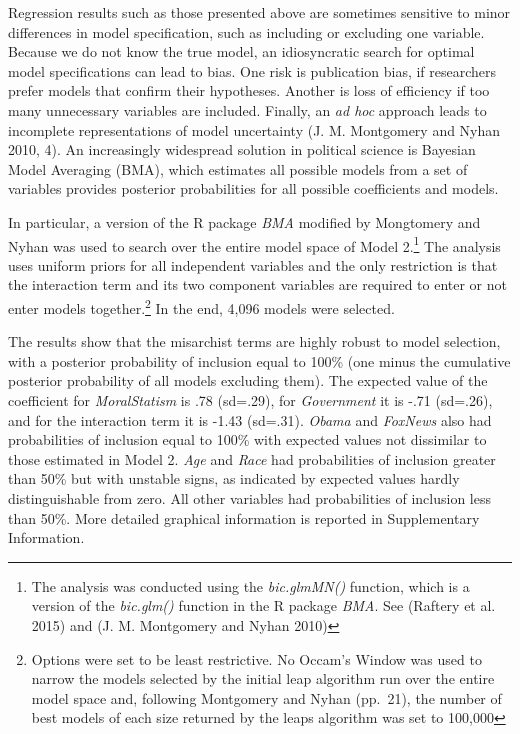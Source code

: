 \documentclass[12pt,]{article}
\let\rmarkdownfootnote\footnote%
\def\footnote{\protect\rmarkdownfootnote}
\begin{document}
Regression results such as those presented above are sometimes sensitive
to minor differences in model specification, such as including or
excluding one variable. Because we do not know the true model, an
idiosyncratic search for optimal model specifications can lead to bias.
One risk is publication bias, if researchers prefer models that confirm
their hypotheses. Another is loss of efficiency if too many unnecessary
variables are included. Finally, an \emph{ad hoc} approach leads to
incomplete representations of model uncertainty (J. M. Montgomery and
Nyhan 2010, 4). An increasingly widespread solution in political science
is Bayesian Model Averaging (BMA), which estimates all possible models
from a set of variables provides posterior probabilities for all
possible coefficients and models.

In particular, a version of the R package \emph{BMA} modified by
Mongtomery and Nyhan was used to search over the entire model space of
Model 2.\footnote{The analysis was conducted using the
  \emph{bic.glmMN()} function, which is a version of the
  \emph{bic.glm()} function in the R package \emph{BMA}. See (Raftery et
  al. 2015) and (J. M. Montgomery and Nyhan 2010)} The analysis uses
uniform priors for all independent variables and the only restriction is
that the interaction term and its two component variables are required
to enter or not enter models together.\footnote{Options were set to be
  least restrictive. No Occam's Window was used to narrow the models
  selected by the initial leap algorithm run over the entire model space
  and, following Montgomery and Nyhan (pp.~21), the number of best
  models of each size returned by the leaps algorithm was set to 100,000}
In the end, 4,096 models were selected.

The results show that the misarchist terms are highly robust to model
selection, with a posterior probability of inclusion equal to 100\% (one
minus the cumulative posterior probability of all models excluding
them). The expected value of the coefficient for \emph{MoralStatism} is
.78 (sd=.29), for \emph{Government} it is -.71 (sd=.26), and for the
interaction term it is -1.43 (sd=.31). \emph{Obama} and \emph{FoxNews}
also had probabilities of inclusion equal to 100\% with expected values
not dissimilar to those estimated in Model 2. \emph{Age} and \emph{Race}
had probabilities of inclusion greater than 50\% but with unstable
signs, as indicated by expected values hardly distinguishable from zero.
All other variables had probabilities of inclusion less than 50\%. More
detailed graphical information is reported in Supplementary Information.
\end{document}

